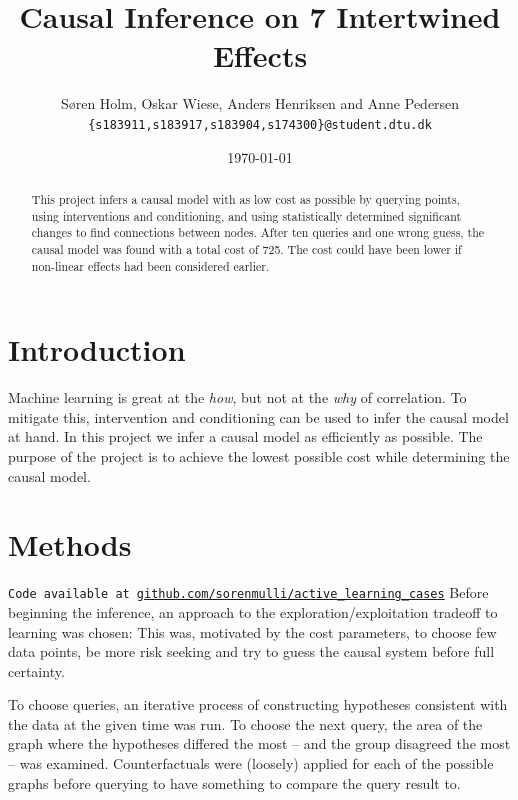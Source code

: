 \documentclass[12pt,fleqn,]{article}
\title{\vspace*{-3.75cm}Causal Inference on 7 Intertwined Effects \vspace*{-8mm}}
\author{\small Søren Holm, Oskar Wiese, Anders Henriksen and Anne Pedersen \\
\small {\texttt{\{s183911,s183917,s183904,s174300\}@student.dtu.dk}}}
\date{\vspace*{-3mm} \small \today}
\begin{document}
\maketitle

\vspace*{-1cm}
\footnotesize\begin{abstract}
\scriptsize \noindent This project infers a causal model with as low cost as possible by querying points, using interventions and conditioning, and using statistically determined significant changes to find connections between nodes. After ten queries and one wrong guess, the causal model was found with a total cost of 725. The cost could have been lower if non-linear effects had been considered earlier.
\end{abstract}


\begin{multicols}{2}
	
	
\section{Introduction} 

Machine learning is great at the \textit{how}, but not at the \textit{why} of correlation. To mitigate this, intervention and conditioning can be used to infer the causal model at hand. In this project we infer a causal model as efficiently as possible. The purpose of the project is to achieve the lowest possible cost while determining the causal model. 

\section{Methods}
\texttt{Code available at \url{github.com/sorenmulli/active_learning_cases}} \newline
Before beginning the inference, an approach to the exploration/exploitation tradeoff to learning was chosen: This was, motivated by the cost parameters, to choose few data points, be more risk seeking and try to guess the causal system before full certainty.

To choose queries, an iterative process of constructing hypotheses consistent with the data at the given time was run. To choose the next query, the area of the graph where the hypotheses differed the most -- and the group disagreed the most -- was examined. Counterfactuals were (loosely) applied for each of the possible graphs before querying to have something to compare the query result to. 


\end{multicols}
\end{document}
